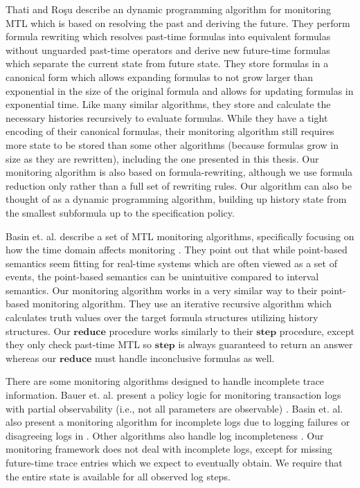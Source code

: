 \documentclass[]{../llncs/llncs}
\begin{document}
Thati and Ro\c{s}u \cite{Thati2005} describe an dynamic programming algorithm for monitoring MTL which is based on resolving the past and deriving the future. They perform formula rewriting which resolves past-time formulas into equivalent formulas without unguarded past-time operators and derive new future-time formulas which separate the current state from future state. 
They store formulas in a canonical form which allows expanding formulas to not grow larger than exponential in the size of the original formula and allows for updating formulas in exponential time. Like many similar algorithms, they store and calculate the necessary histories recursively to evaluate formulas. While they have a tight encoding of their canonical formulas, their monitoring algorithm still requires more state to be stored than some other algorithms (because formulas grow in size as they are rewritten), including the one presented in this thesis. 
%
Our monitoring algorithm is also based on formula-rewriting, although we use formula reduction only rather than a full set of rewriting rules. Our algorithm can also be thought of as a dynamic programming algorithm, building up history state from the smallest subformula up to the specification policy. 


Basin et. al. describe a set of MTL monitoring algorithms, specifically focusing on how the time domain affects monitoring \cite{Basin2012}. They point out that while point-based semantics seem fitting for real-time systems which are often viewed as a set of events, the point-based semantics can be unintuitive compared to interval semantics. Our monitoring algorithm works in a very similar way to their point-based monitoring algorithm. They use an iterative recursive algorithm which calculates truth values over the target formula structures utilizing history structures. 
Our $\mathbf{reduce}$ procedure works similarly to their $\mathbf{step}$ procedure, except they only check past-time MTL so $\mathbf{step}$ is always guaranteed to return an answer whereas our $\mathbf{reduce}$ must handle inconclusive formulas as well.

There are some monitoring algorithms designed to handle incomplete trace information. Bauer et. al. present a policy logic for monitoring transaction logs with partial observability (i.e., not all parameters are observable) \cite{Bauer2009}. Basin et. al. also present a monitoring algorithm for incomplete logs due to logging failures or disagreeing logs in \cite{Basin2013}. Other algorithms also handle log incompleteness \cite{Garg2011,Chowdhury2014}.
Our monitoring framework does not deal with incomplete logs, except for missing future-time trace entries which we expect to eventually obtain. We require that the entire state is available for all observed log steps.
\end{document}
